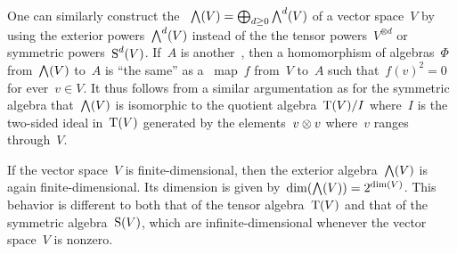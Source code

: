 \begin{remark}
	One can similarly construct the ~$\operatorname{\bigwedge}(V) = \bigoplus_{d \geq 0} \operatorname{\bigwedge}^d(V)$ of a vector space~$V$ by using the exterior powers~$\operatorname{\bigwedge}^d(V)$ instead of the the tensor powers~$V^{\otimes d}$ or symmetric powers~$\operatorname{S}^d(V)$.
	If~$A$ is another~\algebra{$\kf$}, then a homomorphism of algebras~$\Phi$ from~$\operatorname{\bigwedge}(V)$ to~$A$ is \enquote{the same} as a~\linear{$\kf$} map~$f$ from~$V$ to~$A$ such that~$f(v)^2 = 0$ for ever~$v \in V$.
	It thus follows from a similar argumentation as for the symmetric algebra that~$\operatorname{\bigwedge}(V)$ is isomorphic to the quotient algebra~$\operatorname{T}(V)/I$ where~$I$ is the two-sided ideal in~$\operatorname{T}(V)$ generated by the elements~$v \otimes v$ where~$v$ ranges through~$V$.
	
	If the vector space~$V$ is finite-dimensional, then the exterior algebra~$\operatorname{\bigwedge}(V)$ is again finite-dimensional.
	Its dimension is given by~$\dim( \operatorname{\bigwedge}(V) ) = 2^{\dim(V)}$.
	This behavior is different to both that of the tensor algebra~$\operatorname{T}(V)$ and that of the symmetric algebra~$\operatorname{S}(V)$, which are infinite-dimensional whenever the vector space~$V$ is nonzero.
\end{remark}






